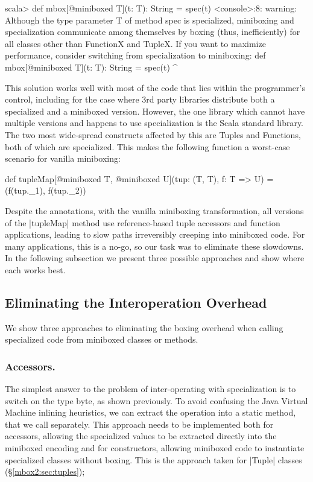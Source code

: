 \begin{lstlisting-nobreak-nolang}
scala>  def mbox[@miniboxed T](t: T): String = spec(t)
<console>:8: warning: Although the type parameter T of method spec is specialized, miniboxing and specialization communicate among themselves by boxing (thus, inefficiently) for all classes other than FunctionX and TupleX. If you want to maximize performance, consider switching from specialization to miniboxing:
        def mbox[@miniboxed T](t: T): String = spec(t)
                                                            ^
\end{lstlisting-nobreak-nolang}

This solution works well with most of the code that lies within the programmer's control, including for the case where 3rd party libraries distribute both a specialized and a miniboxed version. However, the one library which cannot have multiple versions and happens to use specialization is the Scala standard library. The two most wide-spread constructs affected by this are Tuples and Functions, both of which are specialized. This makes the following function a worst-case scenario for vanilla miniboxing:

\begin{lstlisting-nobreak}
 def tupleMap[@miniboxed T,
                  @miniboxed U](tup: (T, T), f: T => U) =
   (f(tup._1), f(tup._2))
\end{lstlisting-nobreak}

Despite the annotations, with the vanilla miniboxing transformation, all versions of the |tupleMap| method use reference-based tuple accessors and function applications, leading to slow paths irreversibly creeping into miniboxed code. For many applications, this is a no-go, so our task was to eliminate these slowdowns. In the following subsection we present three possible approaches and show where each works best.



\subsection{Eliminating the Interoperation Overhead}



We show three approaches to eliminating the boxing overhead when calling specialized code from miniboxed classes or methods.



\subsubsection*{Accessors.} The simplest answer to the problem of inter-operating with specialization is to switch on the type byte, as shown previously. To avoid confusing the Java Virtual Machine inlining heuristics, we can extract the operation into a static method, that we call separately. This approach needs to be implemented both for accessors, allowing the specialized values to be extracted directly into the miniboxed encoding and for constructors, allowing miniboxed code to instantiate specialized classes without boxing. This is the approach taken for |Tuple| classes (\S\ref{mbox2:sec:tuples});



